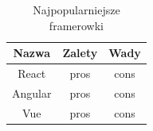 \documentclass[12pt]{report}
\begin{document}
	
	\begin{table}[h]
	\centering
	\begin{tabular}{|c|c|c|} 
	\hline
	Nazwa & Zalety & Wady \\ 
	\hline
	React &
	pros
	  &
	cons \\ 
	\hline
	 Angular & pros & cons \\
	 \hline
	 Vue & pros & cons \\
	 
	\hline
	\end{tabular}
	\caption{Najpopularniejsze framerowki}
	\end{table}
	

	\listoffigures
	
\end{document}
